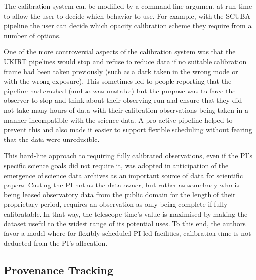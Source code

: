 \documentclass[final,authoryear,5p,times,twocolumn]{elsarticle}
\begin{document}
The calibration system can be modified by a command-line argument at
run time to allow the user to decide which behavior to use. For
example, with the SCUBA pipeline \citep{1999ASPC..172..171J} the user
can decide which opacity calibration scheme they require from a number
of options.

One of the more controversial aspects of the calibration system was
that the UKIRT pipelines would stop and refuse to reduce data if no
suitable calibration frame had been taken previously (such as a dark
taken in the wrong mode or with the wrong exposure). This sometimes
led to people reporting that the pipeline had crashed (and so was
unstable) but the purpose was to force the observer to stop and think
about their observing run and ensure that they did not take many hours
of data with their calibration observations being taken in a manner
incompatible with the science data. A pro-active pipeline helped to
prevent this and also made it easier to support flexible scheduling
\citep{2002ASPC..281..488E,2004SPIE.5493...24A} without fearing that
the data were unreducible.

This hard-line approach to requiring fully calibrated observations,
even if the PI's specific science goals did not require it, was
adopted in anticipation of the emergence of science data archives as
an important source of data for scientific papers. Casting the PI not
as the data owner, but rather as somebody who is being leased
observatory data from the public domain for the length of their
proprietary period, requires an observation as only being complete if
fully calibratable. In that way, the telescope time's value is
maximised by making the dataset useful to the widest range of its
potential uses. To this end, the authors favor a model where for
flexibly-scheduled PI-led facilities, calibration time is not deducted
from the PI's allocation.

\subsection{Provenance Tracking}
\end{document}
